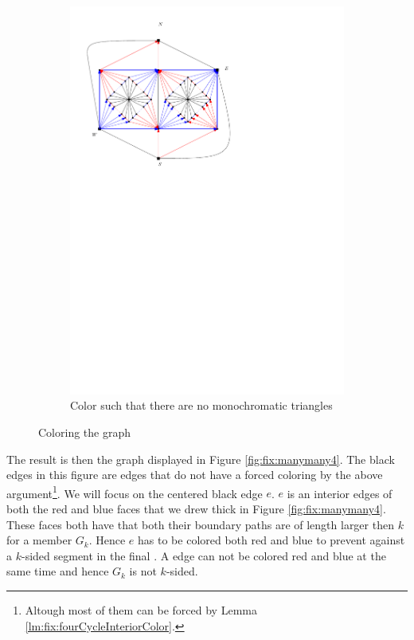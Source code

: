 \begin{figure}[h]
\begin{subfigure}[t]{0.3\textwidth}
      \includegraphics[width=\textwidth]{fixExtension/img/manymany3}
      \caption{Color such that there are no monochromatic triangles}
      \label{fig:fix:manymany3}
    \end{subfigure}
    \caption{Coloring the graph}
    \label{fig:fix:coloring}
  \end{figure}

  The result is then the graph displayed in Figure \ref{fig:fix:manymany4}. The black edges in this figure are edges that do not have a forced coloring by the above argument\footnote{Altough most of them can be forced by Lemma \ref{lm:fix:fourCycleInteriorColor}.}.
  We will focus on the centered black edge $e$. $e$ is an interior edges of both the red and blue faces that we drew thick in Figure \ref{fig:fix:manymany4}. These faces both have that both their boundary paths are of length larger then $k$ for a member $G_k$. Hence $e$ has to be colored both red and blue to prevent against a $k$-sided segment in the final \rel. A edge can not be colored red and blue at the same time and hence $G_k$ is not $k$-sided.


